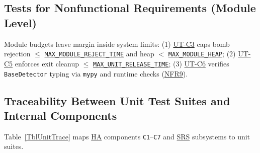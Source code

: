 \documentclass[12pt, titlepage]{article}
\newcommand{\MaxModuleRejectTime}{\hyperref[const:MAX_MODULE_REJECT_TIME]{\texttt{MAX\_\allowbreak{}MODULE\_\allowbreak{}REJECT\_\allowbreak{}TIME}}}
\newcommand{\MaxModuleHeap}{\hyperref[const:MAX_MODULE_HEAP]{\texttt{MAX\_\allowbreak{}MODULE\_\allowbreak{}HEAP}}}
\newcommand{\MaxUnitReleaseTime}{\hyperref[const:MAX_UNIT_RELEASE_TIME]{\texttt{MAX\_\allowbreak{}UNIT\_\allowbreak{}RELEASE\_\allowbreak{}TIME}}}
\newcommand{\HA}{\hyperlink{vnv-acr-ha}{HA}}
\newcommand{\SRS}{\hyperlink{vnv-acr-srs}{SRS}}
\begin{document}
\subsection{Tests for Nonfunctional Requirements (Module Level)}\label{subsec:unit-nfr}

Module budgets leave margin inside system limits: (1) \hyperref[ut:C3]{UT-C3} caps bomb rejection $\le$ \MaxModuleRejectTime{} and heap $<$ \MaxModuleHeap{}; (2) \hyperref[ut:C5]{UT-C5} enforces exit cleanup $\le$ \MaxUnitReleaseTime{}; (3) \hyperref[ut:C6]{UT-C6} verifies \texttt{BaseDetector} typing via \texttt{mypy} and runtime checks (\hyperref[req:NFR9]{NFR9}).

\subsection{Traceability Between Unit Test Suites and Internal Components}\label{subsec:unit-trace}

Table~\ref{TblUnitTrace} maps \HA{} components \texttt{C1}--\texttt{C7} and \SRS{} subsystems to unit suites.
\end{document}
